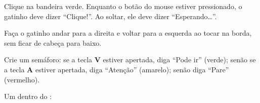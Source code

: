\begin{exercicio}
Clique na bandeira verde. Enquanto o botão do mouse estiver pressionado, o gatinho deve dizer ``Clique!''. Ao soltar, ele deve dizer ``Esperando\ldots''.
\end{exercicio}

\begin{solucao}
\begin{pilha}
\sbcend
\sbcend
\end{pilha}
\end{solucao}

\begin{exercicio}
Faça o gatinho andar para a direita e voltar para a esquerda ao tocar na borda, sem ficar de cabeça para baixo.
\end{exercicio}

\begin{solucao}
\begin{pilha}
\sbcend
\end{pilha}
\end{solucao}

\begin{desafio}[Semáforo]
Crie um semáforo: se a tecla \textbf{V} estiver apertada, diga ``Pode ir'' (verde); senão se a tecla \textbf{A} estiver apertada, diga ``Atenção'' (amarelo); senão diga ``Pare'' (vermelho).
\end{desafio}

\begin{solucao}
Um  dentro do :
\begin{pilha}
\sbcend
\sbcend
\sbcend
\end{pilha}
\end{solucao}
